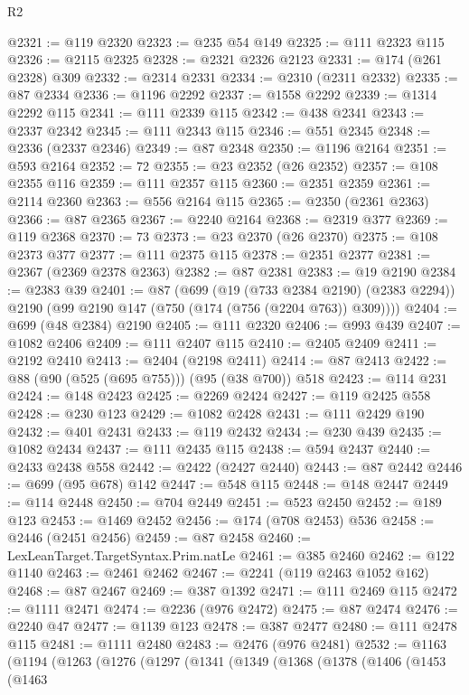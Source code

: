 \begin{lexlean}{R2}
\begin{coremodule}
{{{{{{{{{{{{{{{{{{{{{{{{{{{{{{{{{{{{{{{{{{{{{{{{{{{{{{{{{{{{{{{{{{{{{{{{{{{{{{{{{{{{{{{{{{{{{{{{{{{{{{{{{{{{{{{{{{{{{{{{{{{{{{{{{{{{{{{{{{{{@2321 := @119 @2320
@2323 := @235 @54 @149
@2325 := @111 @2323 @115
@2326 := @2115 @2325
@2328 := @2321 @2326 @2123
@2331 := @174 (@261 @2328) @309
@2332 := @2314 @2331
@2334 := @2310 (@2311 @2332)
@2335 := @87 @2334
@2336 := @1196 @2292
@2337 := @1558 @2292
@2339 := @1314 @2292 @115
@2341 := @111 @2339 @115
@2342 := @438 @2341
@2343 := @2337 @2342
@2345 := @111 @2343 @115
@2346 := @551 @2345
@2348 := @2336 (@2337 @2346)
@2349 := @87 @2348
@2350 := @1196 @2164
@2351 := @593 @2164
@2352 := 72
@2355 := @23 @2352 (@26 @2352)
@2357 := @108 @2355 @116
@2359 := @111 @2357 @115
@2360 := @2351 @2359
@2361 := @2114 @2360
@2363 := @556 @2164 @115
@2365 := @2350 (@2361 @2363)
@2366 := @87 @2365
@2367 := @2240 @2164
@2368 := @2319 @377
@2369 := @119 @2368
@2370 := 73
@2373 := @23 @2370 (@26 @2370)
@2375 := @108 @2373 @377
@2377 := @111 @2375 @115
@2378 := @2351 @2377
@2381 := @2367 (@2369 @2378 @2363)
@2382 := @87 @2381
@2383 := @19 @2190
@2384 := @2383 @39
@2401 := @87
    (@699
      (@19 (@733 @2384 @2190) (@2383 @2294))
      @2190
      (@99 @2190 @147 (@750 (@174 (@756 (@2204 @763)) @309))))
@2404 := @699 (@48 @2384) @2190
@2405 := @111 @2320
@2406 := @993 @439
@2407 := @1082 @2406
@2409 := @111 @2407 @115
@2410 := @2405 @2409
@2411 := @2192 @2410
@2413 := @2404 (@2198 @2411)
@2414 := @87 @2413
@2422 := @88 (@90 (@525 (@695 @755))) (@95 (@38 @700)) @518
@2423 := @114 @231
@2424 := @148 @2423
@2425 := @2269 @2424
@2427 := @119 @2425 @558
@2428 := @230 @123
@2429 := @1082 @2428
@2431 := @111 @2429 @190
@2432 := @401 @2431
@2433 := @119 @2432
@2434 := @230 @439
@2435 := @1082 @2434
@2437 := @111 @2435 @115
@2438 := @594 @2437
@2440 := @2433 @2438 @558
@2442 := @2422 (@2427 @2440)
@2443 := @87 @2442
@2446 := @699 (@95 @678) @142
@2447 := @548 @115
@2448 := @148 @2447
@2449 := @114 @2448
@2450 := @704 @2449
@2451 := @523 @2450
@2452 := @189 @123
@2453 := @1469 @2452
@2456 := @174 (@708 @2453) @536
@2458 := @2446 (@2451 @2456)
@2459 := @87 @2458
@2460 := LexLeanTarget.TargetSyntax.Prim.natLe
@2461 := @385 @2460
@2462 := @122 @1140
@2463 := @2461 @2462
@2467 := @2241 (@119 @2463 @1052 @162)
@2468 := @87 @2467
@2469 := @387 @1392
@2471 := @111 @2469 @115
@2472 := @1111 @2471
@2474 := @2236 (@976 @2472)
@2475 := @87 @2474
@2476 := @2240 @47
@2477 := @1139 @123
@2478 := @387 @2477
@2480 := @111 @2478 @115
@2481 := @1111 @2480
@2483 := @2476 (@976 @2481)
@2532 := @1163
    (@1194
      (@1263
        (@1276
          (@1297
            (@1341
              (@1349
                (@1368
                  (@1378
                    (@1406
                      (@1453
                        (@1463
}}}}}}}}}}}}}}}}}}}}}}}}}}}}}}}}}}}}}}}}}}}}}}}}}}}}}}}}}}}}}}}}}}}}}}}}}}}}}}}}}}}}}}}}}}}}}}}}}}}}}}}}}}}}}}}}}}}}}}}}}}}}}}}}}}}}}}}}}}}}
\end{coremodule}
\end{lexlean}
